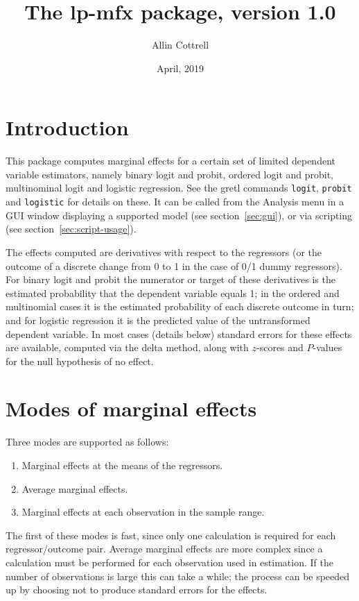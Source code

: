 \documentclass{article}
\begin{document}
\setlength{\parindent}{0pt}
\setlength{\parskip}{1ex}
\setcounter{secnumdepth}{2}

\newcommand{\argname}[1]{\textsl{#1}}
  
\title{The \textsf{lp-mfx} package, version 1.0}
\author{Allin Cottrell}
\date{April, 2019}
\maketitle

\section{Introduction}
\label{sec:intro}

This package computes marginal effects for a certain set of limited
dependent variable estimators, namely binary logit and probit, ordered
logit and probit, multinominal logit and logistic regression. See the
gretl commands \texttt{logit}, \texttt{probit} and \texttt{logistic}
for details on these. It can be called from the \textsf{Analysis} menu
in a GUI window displaying a supported model (see
section~\ref{sec:gui}), or via scripting (see
section~\ref{sec:script-usage}).

The effects computed are derivatives with respect to the regressors
(or the outcome of a discrete change from 0 to 1 in the case of 0/1
dummy regressors). For binary logit and probit the numerator or target
of these derivatives is the estimated probability that the dependent
variable equals 1; in the ordered and multinomial cases it is the
estimated probability of each discrete outcome in turn; and for
logistic regression it is the predicted value of the untransformed
dependent variable. In most cases (details below) standard errors for
these effects are available, computed via the delta method, along with
$z$-scores and $P$-values for the null hypothesis of no effect.

\section{Modes of marginal effects}
\label{sec:modes}

Three modes are supported as follows:
\begin{enumerate}
\item Marginal effects at the means of the regressors.
\item Average marginal effects.
\item Marginal effects at each observation in the sample range.
\end{enumerate}
The first of these modes is fast, since only one calculation is
required for each regressor/outcome pair. Average marginal effects are
more complex since a calculation must be performed for each
observation used in estimation. If the number of observations is large
this can take a while; the process can be speeded up by choosing not
to produce standard errors for the effects.
\end{document}

